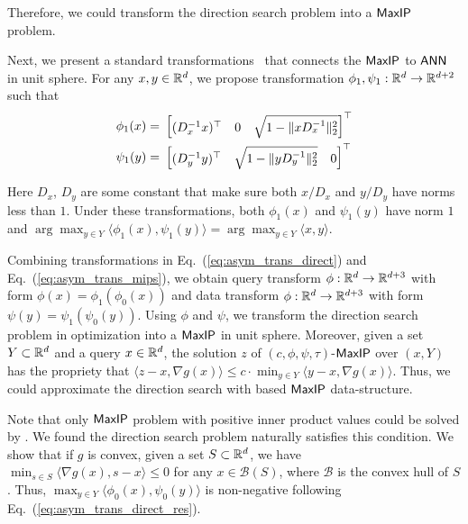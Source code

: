Therefore, we could transform the direction search problem into a $\mathsf{MaxIP}$ problem.

Next, we present a standard transformations~\cite{ns15} that connects the $\mathsf{MaxIP}$ to $\mathsf{ANN}$ in unit sphere. For any $x,y\in \mathbb{R}^d$, we propose transformation $\phi_1,\psi_1:\mathbb{R}^{d} \rightarrow \mathbb{R}^{d+2}$ such that
\begin{align}\label{eq:asym_trans_mips}
  \phi_1(x) =&~ \begin{bmatrix} (D_{x}^{-1}x)^\top & 0 & \sqrt{1-\|x D_{x}^{-1}\|_2^2}  \end{bmatrix}^\top      \notag\\
  \psi_1(y) =&~ \begin{bmatrix} (D_{y}^{-1}y)^\top & \sqrt{1-\|yD_{y}^{-1}\|_2^2} & 0 \end{bmatrix}^\top
\end{align}

Here $D_x$, $D_y$ are some constant that make sure both $x/D_x$ and $y/D_y$ have norms less than $1$. Under these transformations, both $\phi_1(x)$ and $\psi_1(y)$ have norm $1$ and $\arg\max_{y\in Y} \langle \phi_1(x),\psi_1(y)\rangle=\arg\max_{y\in Y} \langle x,y\rangle$.

Combining transformations in Eq.~(\ref{eq:asym_trans_direct}) and Eq.~(\ref{eq:asym_trans_mips}), we obtain query transform $\phi:\mathbb{R}^d\rightarrow \mathbb{R}^{d+3}$ with form $\phi(x)=\phi_1(\phi_0(x))$ and data transform $\phi:\mathbb{R}^d\rightarrow \mathbb{R}^{d+3}$ with form $\psi(y)=\psi_1(\psi_0(y))$. Using $\phi$ and $\psi$, we transform the direction search problem in optimization into a $\mathsf{MaxIP}$ in unit sphere. Moreover, given a set $Y\subset \mathbb{R}^d$ and a query $x\in \mathbb{R}^d$, the solution $z$ of $(c,\phi,\psi,\tau)$-$\mathsf{MaxIP}$ over $(x,Y)$ has the propriety that $\langle z-x,\nabla g(x)\rangle\leq c\cdot \min_{y\in Y} \langle y-x,\nabla g(x) \rangle$. Thus, we could approximate the direction search with {\lsh} based {$\mathsf{MaxIP}$} data-structure.  

Note that only $\mathsf{MaxIP}$ problem with positive inner product values could be solved by {\lsh}. We found the direction search problem naturally satisfies this condition. We show that if $g$ is convex, given a set $S \subset \mathbb{R}^d$, we have $\min_{s \in S } \langle \nabla g(x) ,  s-x \rangle\leq 0$ for any $x\in \mathcal{B}(S)$, where $\mathcal{B}$ is the convex hull of $S$. Thus, $\max_{y\in Y} \langle  \phi_0(x) , \psi_0(y) \rangle$ is non-negative following Eq.~(\ref{eq:asym_trans_direct_res}).

